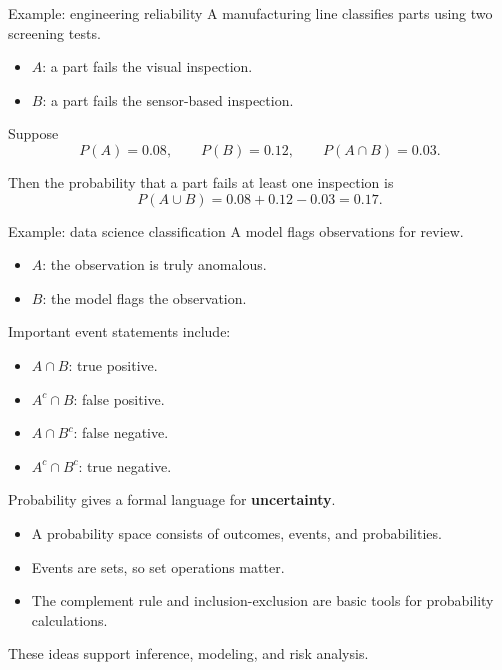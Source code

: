 \documentclass[12pt]{beamer}
\newcommand{\vocab}[1]{\textcolor{AggieMaroon}{\textbf{#1}}}
\begin{document}
\begin{frame}{}
\begin{block}{Example: engineering reliability}
A manufacturing line classifies parts using two screening tests.

\begin{itemize}
  \item $A$: a part fails the visual inspection.
  \item $B$: a part fails the sensor-based inspection.
\end{itemize}

Suppose
\[
P(A)=0.08, \qquad P(B)=0.12, \qquad P(A\cap B)=0.03.
\]

\vspace{0.2cm}
Then the probability that a part fails at least one inspection is
\[
P(A\cup B)=0.08+0.12-0.03=0.17.
\]
\end{block}
\end{frame}

\begin{frame}{}
\begin{block}{Example: data science classification}
A model flags observations for review.

\begin{itemize}
  \item $A$: the observation is truly anomalous.
  \item $B$: the model flags the observation.
\end{itemize}

Important event statements include:
\begin{itemize}
  \item $A\cap B$: true positive.
  \item $A^c\cap B$: false positive.
  \item $A\cap B^c$: false negative.
  \item $A^c\cap B^c$: true negative.
\end{itemize}
\end{block}
\end{frame}

\begin{frame}{}
Probability gives a formal language for \vocab{uncertainty}.
\begin{itemize}
  \item A probability space consists of outcomes, events, and probabilities.
  \item Events are sets, so set operations matter.
  \item The complement rule and inclusion-exclusion are basic tools for probability calculations.
\end{itemize}
These ideas support inference, modeling, and risk analysis.
\end{frame}
\end{document}
